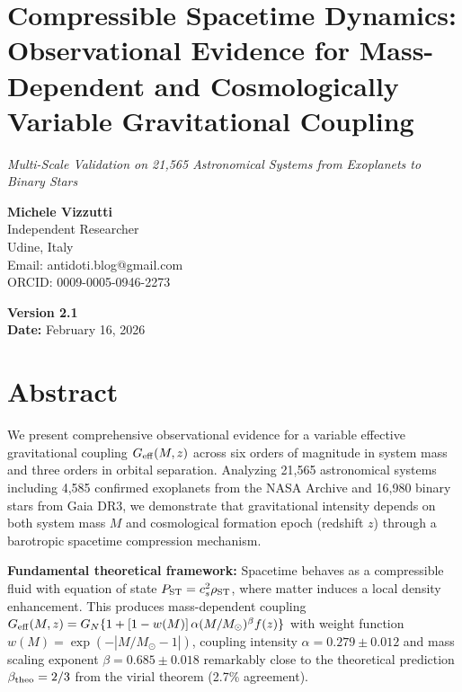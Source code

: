 \documentclass[11pt,a4paper]{article}
\begin{document}
\sloppy  %

\hypertarget{compressible-spacetime-dynamics-observational-evidence-for-mass-dependent-and-cosmologically-variable-gravitational-coupling}{%
\section*{Compressible Spacetime Dynamics: Observational Evidence for
Mass-Dependent and Cosmologically Variable Gravitational
Coupling}\label{compressible-spacetime-dynamics-observational-evidence-for-mass-dependent-and-cosmologically-variable-gravitational-coupling}}

\hypertarget{multi-scale-validation-on-21565-astronomical-systems-from-exoplanets-to-binary-stars}{%
{\large\textit{Multi-Scale Validation on 21,565 Astronomical Systems from Exoplanets to Binary Stars}}\label{multi-scale-validation-on-21565-astronomical-systems-from-exoplanets-to-binary-stars}}

\textbf{Michele Vizzutti}\\
Independent Researcher\\
Udine, Italy\\
Email: antidoti.blog@gmail.com \\ ORCID: 0009-0005-0946-2273

\textbf{Version 2.1}\\
\textbf{Date:} February 16, 2026

\hypertarget{abstract}{%
\section*{Abstract}\label{abstract}}

We present comprehensive observational evidence for a variable effective
gravitational coupling \(G_{\rm eff}(M,z)\) across six orders of
magnitude in system mass and three orders in orbital separation.
Analyzing 21,565 astronomical systems including 4,585 confirmed
exoplanets from the NASA Archive and 16,980 binary stars from Gaia DR3,
we demonstrate that gravitational intensity depends on both system mass
\(M\) and cosmological formation epoch (redshift \(z\)) through a
barotropic spacetime compression mechanism.

\textbf{Fundamental theoretical framework:} Spacetime behaves as a
compressible fluid with equation of state
\(P_{\rm ST} = c_s^2 \rho_{\rm ST}\), where matter induces a local
density enhancement. This produces mass-dependent coupling
\(G_{\rm eff}(M,z) = G_N\{1 + [1-w(M)]\,\alpha(M/M_\odot)^\beta f(z)\}\)
with weight function \(w(M) = \exp(-|M/M_\odot - 1|)\), coupling
intensity \(\alpha = 0.279 \pm 0.012\) and mass scaling exponent
\(\beta = 0.685 \pm 0.018\) remarkably close to the theoretical
prediction \(\beta_{\rm theo} = 2/3\) from the virial theorem (2.7\%
agreement).
\end{document}
